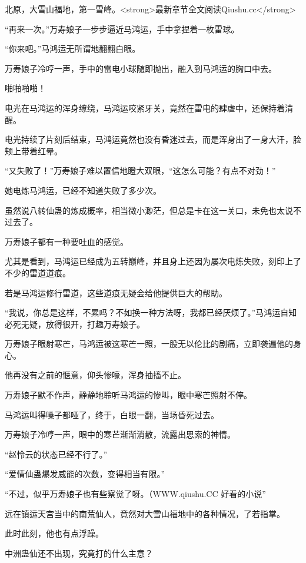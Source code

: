 
\begin{this_body}

北原，大雪山福地，第一雪峰。<strong>最新章节全文阅读Qiushu.cc</strong>

“再来一次。”万寿娘子一步步逼近马鸿运，手中拿捏着一枚雷球。

“你来吧。”马鸿运无所谓地翻翻白眼。

万寿娘子冷哼一声，手中的雷电小球随即抛出，融入到马鸿运的胸口中去。

啪啪啪啪！

电光在马鸿运的浑身缭绕，马鸿运咬紧牙关，竟然在雷电的肆虐中，还保持着清醒。

电光持续了片刻后结束，马鸿运竟然也没有昏迷过去，而是浑身出了一身大汗，脸颊上带着红晕。

“又失败了！”万寿娘子难以置信地瞪大双眼，“这怎么可能？有点不对劲！”

她电炼马鸿运，已经不知道失败了多少次。

虽然说八转仙蛊的炼成概率，相当微小渺茫，但总是卡在这一关口，未免也太说不过去了。

万寿娘子都有一种要吐血的感觉。

尤其是看到，马鸿运已经成为五转巅峰，并且身上还因为屡次电炼失败，刻印上了不少的雷道道痕。

若是马鸿运修行雷道，这些道痕无疑会给他提供巨大的帮助。

“我说，你总是这样，不累吗？不如换一种方法呀，我都已经厌烦了。”马鸿运自知必死无疑，放得很开，打趣万寿娘子。

万寿娘子眼射寒芒，马鸿运被这寒芒一照，一股无以伦比的剧痛，立即袭遍他的身心。

他再没有之前的惬意，仰头惨嚎，浑身抽搐不止。

万寿娘子默不作声，静静地聆听马鸿运的惨叫，眼中寒芒照射不停。

马鸿运叫得嗓子都哑了，终于，白眼一翻，当场昏死过去。

万寿娘子冷哼一声，眼中的寒芒渐渐消散，流露出思索的神情。

“赵怜云的状态已经不行了。”

“爱情仙蛊爆发威能的次数，变得相当有限。”

“不过，似乎万寿娘子也有些察觉了呀。（WWW.qiushu.CC 好看的小说”

远在镇运天宫当中的南荒仙人，竟然对大雪山福地中的各种情况，了若指掌。

此时此刻，他也有点浮躁。

中洲蛊仙还不出现，究竟打的什么主意？


\end{this_body}

